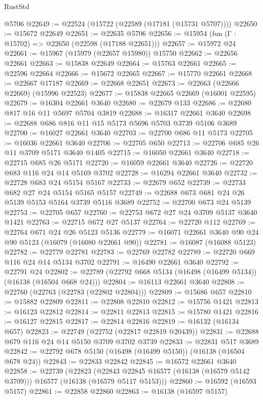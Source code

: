 \begin{lexlean}{RustStd}
\begin{coremodule}
    @5706
@22649 := @22524 (@15722 (@22589 (@17181 (@15731 @5707))))
@22650 := @15672 @22649
@22651 := @22635 @5706
@22656 := @15954 (fun (Γ : @15702) => @22650 (@22598 (@17188 @22651)))
@22657 := @15972 @24
@22661 := @15967 (@15979 (@22657 @15980)) @15750
@22662 := @22656 @22661
@22663 := @15838 @22649
@22664 := @15763 @22661
@22665 := @22596 @22664
@22666 := @15672 @22665
@22667 := @15770 @22661
@22668 := @22667 @17187
@22669 := @22668 @22651
@22673 := @22663 (@22666 @22669) (@15996 @22523)
@22677 := @15838 @22665 @22669 (@16001 @22595)
@22679 := @16304 @22661 @3640
@22680 := @22679 @133
@22686 := @22680 @817 @16 @11 @5697 @5704 @3819
@22688 := @16317 @22661 @3640
@22698 := @22688 @686 @816 @11 @15 @5173 @5696 @5703 @3739 @5106 @3689
@22700 := @16027 @22661 @3640
@22703 := @22700 @686 @11 @5173
@22705 := @16036 @22661 @3640
@22706 := @22705 @650
@22713 := @22706 @685 @26 @11 @3709 @5171 @3640 @1405
@22715 := @16050 @22661 @3640
@22718 := @22715 @685 @26 @5171
@22720 := @16059 @22661 @3640
@22726 := @22720 @683 @116 @24 @14 @5169 @3702
@22728 := @16294 @22661 @3640
@22732 := @22728 @683 @24 @5154 @5167
@22733 := @22679 @652
@22739 := @22733 @682 @27 @24 @5154 @5165 @5157
@22749 := @22688 @673 @681 @24 @26 @5139 @5153 @5164 @3739 @5116 @3689
@22752 := @22700 @673 @24 @5139
@22753 := @22705 @657
@22760 := @22753 @672 @27 @24 @3709 @5137 @3640 @1421
@22763 := @22715 @672 @27 @5137
@22764 := @22720 @112
@22769 := @22764 @671 @24 @26 @5123 @5136
@22779 := @16071 @22661 @3640 @90 @24 @90 @5123 (@16079 (@16080 @22661 @90))
@22781 := @16087 (@16088 @5123)
@22782 := @22779 @22781
@22783 := @22769 @22782
@22789 := @22720 @669 @116 @24 @14 @5134 @3702
@22791 := @16490 @22661 @3640
@22792 := @22791 @24
@22802 := @22789 (@22792 @668 @5134 (@16498 (@16499 @5134)) (@16138 (@16504 @668 @24)))
@22804 := @16113 @22661 @3640
@22808 := @22760 (@22763 (@22783 (@22802 @22804)))
@22809 := @15686 @657
@22810 := @15882 @22809
@22811 := @22808 @22810
@22812 := @15756 @1421
@22813 := @16123 @22812
@22814 := @22811 @22813
@22815 := @15780 @1421
@22816 := @16127 @22815
@22817 := @22814 @22816
@22819 := @16132 (@16134 @657)
@22823 := @22749 (@22752 (@22817 @22819 @20439))
@22831 := @22688 @679 @116 @24 @14 @5150 @3709 @3702 @3739
@22833 := @22831 @517 @3689
@22842 := @22792 @678 @5150 (@16498 (@16499 @5150)) (@16138 (@16504 @678 @24))
@22843 := @22833 @22842
@22845 := @16572 @22661 @3640
@22858 := @22739
    (@22823
      (@22843 @22845 @16577 (@16138 (@16579 @5142 @3709)))
      @16577
      (@16138 (@16579 @5117 @5153)))
@22860 := @16592 (@16593 @5157)
@22861 := @22858 @22860
@22863 := @16138 (@16597 @5157)

\end{coremodule}
\end{lexlean}
